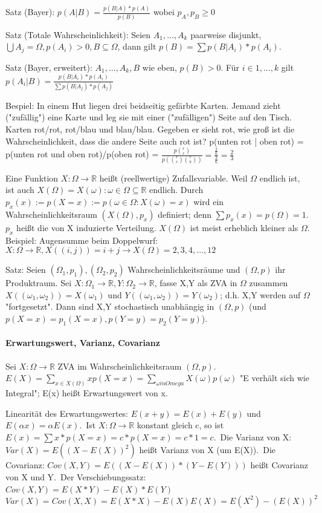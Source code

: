 \documentclass[10pt,landscape]{article}
\begin{document}
\begin{multicols}{3}
Satz (Bayer): $p(A|B)=\frac{p(B|A)*p(A)}{p(B)}$ wobei $p_A, p_B \geq 0$

Satz (Totale Wahrscheinlichkeit): Seien $A_1, ...,A_k$ paarweise disjunkt, $\bigcup A_j=\Omega, p(A_i)>0, B\subseteq \Omega$, dann gilt $p(B)=\sum p(B|A_i)*p(A_i)$.

Satz (Bayer, erweitert): $A_1,...,A_k,B$ wie eben, $p(B)>0$. Für $i\in {1,...,k}$ gilt $p(A_i|B)=\frac{p(B|A_i)*p(A_i)}{\sum p(B|A_j)*p(A_j)}$

Bespiel: In einem Hut liegen drei beidseitig gefärbte Karten. Jemand zieht ("zufällig") eine Karte und leg sie mit einer ("zufälligen") Seite auf den Tisch. Karten rot/rot, rot/blau und blau/blau. Gegeben er sieht rot, wie groß ist die Wahrscheinlichkeit, dass die andere Seite auch rot ist?
p(unten rot | oben rot) = p(unten rot und oben rot)/p(oben rot) = $\frac{p\binom{r}{r}}{p(\binom{r}{r}\binom{r}{b})}=\frac{\frac{2}{6}}{\frac{3}{6}}=\frac{2}{3}$

Eine Funktion $X:\Omega \rightarrow \mathbb{R}$ heißt (reellwertige) Zufallsvariable. Weil $\Omega$ endlich ist, ist auch $X(\Omega)={X(\omega): \omega \in \Omega}\subseteq \mathbb{R}$ endlich. Durch $p_x(x):=p(X=x):=p({\omega \in \Omega: X(\omega)=x})$ wird ein Wahrscheinlichkeitsraum $(X(\Omega),p_x)$ definiert; denn $\sum p_x(x)=p(\Omega)=1$. $p_x$ heißt die von X induzierte Verteilung. $X(\Omega)$ ist meist erheblich kleiner als $\Omega$.
Beispiel: Augensumme beim Doppelwurf: $X:\Omega\rightarrow \mathbb{R}, X((i,j))=i+j \rightarrow X(\Omega)={2,3,4,...,12}$

Satz: Seien $(\Omega_1, p_1),(\Omega_2, p_2)$ Wahrscheinlichkeitsräume und $(\Omega, p)$ ihr Produktraum. Sei $X:\Omega_1\rightarrow\mathbb{R},Y:\Omega_2\rightarrow \mathbb{R}$, fasse X,Y als ZVA in $\Omega$ zusammen $X((\omega_1,\omega_2))=X(\omega_1)$ und $Y((\omega_1,\omega_2))=Y(\omega_2)$; d.h. X,Y werden auf $\Omega$ "fortgesetzt". Dann sind X,Y stochastisch unabhängig in $(\Omega, p)$ (und $p(X=x)=p_1(X=x), p(Y=y)=p_2(Y=y)$).

\paragraph{Erwartungswert, Varianz, Covarianz}
Sei $X:\Omega\rightarrow \mathbb{R}$ ZVA im Wahrscheinlichkeitsraum $(\Omega, p)$. $E(X)=\sum_{x\in X(\Omega)}x p(X=x)=\sum_{\omega in Omega} X(\omega)p(\omega)$ "E verhält sich wie Integral"; E(x) heißt Erwartungswert von x.

Linearität des Erwartungswertes: $E(x+y)=E(x)+E(y)$ und $E(\alpha x)=\alpha E(x)$.\
Ist $X:\Omega\rightarrow \mathbb{R}$ konstant gleich c, so ist $E(x)=\sum x*p(X=x)=c*p(X=x)=c*1=c$.\
Die Varianz von X: $Var(X)=E((X-E(X))^2)$ heißt Varianz von X (um E(X)).\
Die Covarianz: $Cov(X,Y)=E((X-E(X))*(Y-E(Y)))$ heißt Covarianz von X und Y.\
Der Verschiebungssatz: $Cov(X,Y)=E(X*Y)-E(X)*E(Y)$\
$Var(X)=Cov(X,X)=E(X*X)-E(X)E(X)=E(X^2)-(E(X))^2$


\end{multicols}
\end{document}
